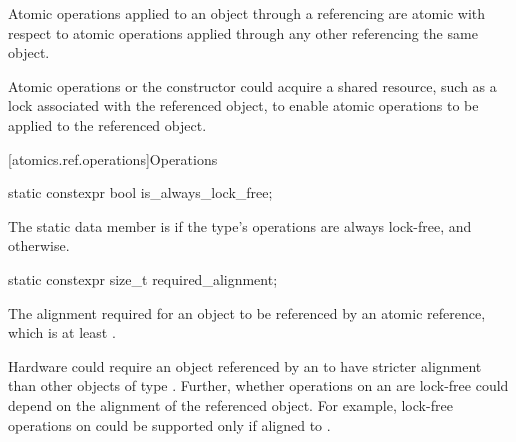 \pnum
Atomic operations applied to an object
through a referencing  are atomic with respect to
atomic operations applied through any other 
referencing the same object.
\begin{note}
Atomic operations or the  constructor could acquire
a shared resource, such as a lock associated with the referenced object,
to enable atomic operations to be applied to the referenced object.
\end{note}

[atomics.ref.operations]{Operations}

%
%
%
%
\begin{itemdecl}
static constexpr bool is_always_lock_free;
\end{itemdecl}

\begin{itemdescr}
\pnum
The static data member  is 
if the  type's operations are always lock-free,
and  otherwise.
\end{itemdescr}

%
%
%
%
\begin{itemdecl}
static constexpr size_t required_alignment;
\end{itemdecl}

\begin{itemdescr}
\pnum
The alignment required for an object to be referenced by an atomic reference,
which is at least .

\pnum
\begin{note}
Hardware could require an object
referenced by an 
to have stricter alignment
than other objects of type .
Further, whether operations on an 
are lock-free could depend on the alignment of the referenced object.
For example, lock-free operations on 
could be supported only if aligned to .
\end{note}
\end{itemdescr}

